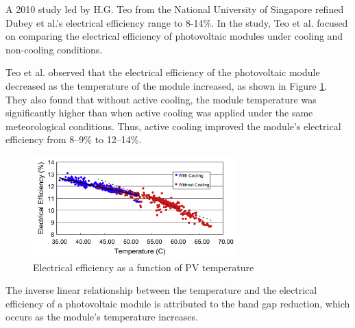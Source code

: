 \noindent A 2010 study led by H.G. Teo from the National University of Singapore refined Dubey et al.'s electrical efficiency range to 8-14\%. In the study, Teo et al. focused on comparing the electrical efficiency of photovoltaic modules under cooling and non-cooling conditions.\par\vspace{0.5em}

\noindent Teo et al. observed that the electrical efficiency of the photovoltaic module decreased as the temperature of the module increased, as shown in Figure \ref{fig:electrical_efficiency_vs_temperature_pv_module}. They also found that without active cooling, the module temperature was significantly higher than when active cooling was applied under the same meteorological conditions. Thus, active cooling improved the module’s electrical efficiency from 8–9\% to 12–14\%. \cite{Teo2012AnModules}

\begin{figure}[ht]
    \centering
    \includegraphics[width=0.7\textwidth]{Figures/electrical_efficiency_vs_temperature_pv_module.png}
    \caption{Electrical efficiency as a function of PV temperature \cite{Teo2012AnModules}}
    \label{fig:electrical_efficiency_vs_temperature_pv_module}
\end{figure}
\FloatBarrier

\noindent The inverse linear relationship between the temperature and the electrical efficiency of a photovoltaic module is attributed to the band gap reduction, which occurs as the module's temperature increases.\vspace{0.5em}

